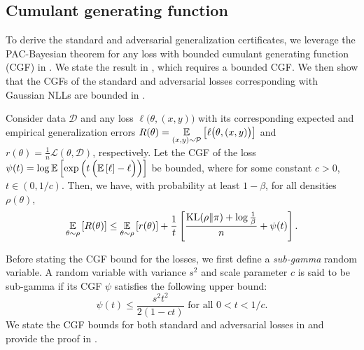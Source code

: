 \subsection{Cumulant generating function}%

To derive the standard and adversarial generalization certificates, we leverage the PAC-Bayesian theorem for any loss with bounded cumulant generating function (CGF) in \citet{banerjee2021information}. 
We state the result in , which requires a bounded CGF.
We then show that the CGFs of the standard and adversarial losses corresponding with Gaussian NLLs are bounded in . 
\begin{theorem} \label{th:pac_bayes_bounded_cgf}
Consider data $\mathcal{D}$ and any loss $\ell \big(\theta, (x,y)\big)$ with its corresponding expected and empirical generalization errors $R(\theta)=\underset{(x,y) \sim \mathcal{P}}{\mathbb{E}}\left[\ell \big(\theta, (x,y)\big)\right]$ and $r(\theta)=\frac{1}{n} \mathcal{L}(\theta, \mathcal{D})$, respectively.  %
Let the CGF of the loss $\psi(t) = \log \underset{}{\mathbb{E}}\left[\exp \left( t \left( \underset{}{\mathbb{E}}\left[\ell \right] - \ell  \right) \right)\right]$  be bounded, where for some constant $c>0$, $t \in (0,1/c)$. 
Then, we have, with probability at least $1-\beta$, for all densities 
$\rho(\theta)$,
    $$\underset{\theta \sim \rho}{\mathbb{E}}\left[R(\theta)\right]
\leq 
\underset{\theta \sim \rho}{\mathbb{E}}\left[r(\theta)\right] 
+ \frac{1}{t} \left[ \frac{\mathrm{KL}({\rho} \| \pi) + \log \frac{1}{\beta}}{n} + \psi(t) \right].$$
\end{theorem}
Before stating the CGF bound for the losses, we first define a \textit{sub-gamma} random variable. A random variable with variance $s^2$ and scale parameter $c$ is said to be sub-gamma if its CGF $\psi$ satisfies the following upper bound: 
$$\psi(t) \leq \frac{s^2t^2}{2(1-ct)} \text{ for all } 0 < t < 1/c.$$ 
We state the CGF bounds for both standard and adversarial losses in  and provide the proof in .

